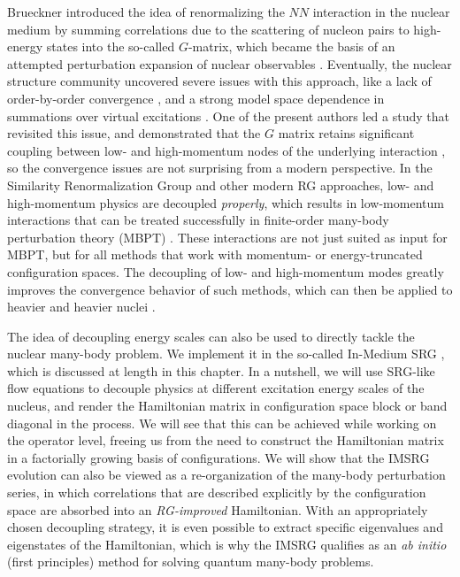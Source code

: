 Brueckner introduced the idea of renormalizing the $NN$ interaction in the
nuclear medium by summing correlations due to the scattering of nucleon
pairs to high-energy states into the so-called $G$-matrix, which became
the basis of an attempted perturbation expansion of nuclear observables 
\cite{Brueckner:1954qf,Brueckner:1955rw,Bethe:1957qv,Goldstone:1957zz,Day:1967zl,Brandow:1967tg}.
Eventually, the nuclear structure community uncovered severe issues with
this approach, like a lack of order-by-order convergence 
\cite{Barrett:1970jl,Kirson:1971la,Barrett:1972bs,Kirson:1974oq,Goode:1974pi},
and a strong model space dependence in summations over virtual excitations
\cite{Vary:1973dn}. One of the present authors led a study that revisited 
this issue, and demonstrated that the $G$ matrix retains significant coupling 
between low- and high-momentum nodes of the underlying interaction 
\cite{Bogner:2010pq}, so the convergence issues are not surprising from a 
modern perspective. In the Similarity Renormalization Group \cite{Glazek:1993il,Wegner:1994dk}
and other modern RG approaches, low- and high-momentum physics are decoupled 
\emph{properly}, which results in low-momentum interactions that can be
treated successfully in finite-order many-body perturbation theory (MBPT) 
\cite{Bogner:2006qf,Bogner:2010pq,Roth:2010ys,Tichai:2016vl}. These 
interactions are not just suited as input for MBPT, but for all
methods that work with momentum- or energy-truncated configuration 
spaces. The decoupling of low- and high-momentum modes greatly improves 
the convergence behavior of such methods, which can then be applied to 
heavier and heavier nuclei
\cite{Barrett:2013oq,Jurgenson:2013fk,Hergert:2013ij,Roth:2014fk,Binder:2014fk,Hagen:2014ve,Hagen:2016rb}.

The idea of decoupling energy scales can also be used to directly
tackle the nuclear many-body problem. We implement it in the so-called
In-Medium SRG \cite{Tsukiyama:2011uq,Hergert:2013mi,Hergert:2016jk},
which is discussed at length in this chapter. In a nutshell, we will 
use SRG-like flow equations to decouple physics at different excitation 
energy scales of the nucleus, and render the Hamiltonian matrix in 
configuration space block or band diagonal in the process. We will see
that this can be achieved while working on the operator level, freeing
us from the need to construct the Hamiltonian matrix in a factorially 
growing basis of configurations. We will show that the IMSRG evolution
can also be viewed as a re-organization of the many-body perturbation
series, in which correlations that are described explicitly by the 
configuration space are absorbed into an \emph{RG-improved} Hamiltonian. 
With an appropriately chosen decoupling strategy, it is even possible to 
extract specific eigenvalues and eigenstates of the Hamiltonian, which is
why the IMSRG qualifies as an \emph{ab initio} (first principles) method 
for solving quantum many-body problems.

